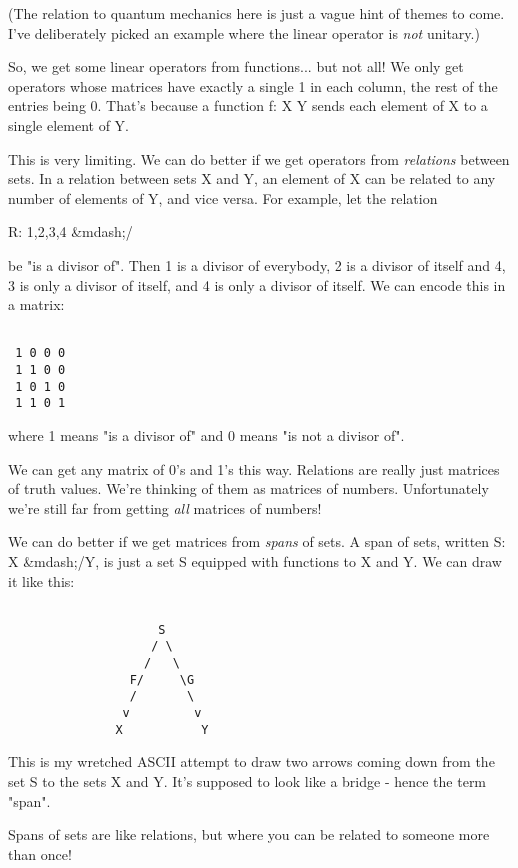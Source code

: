 (The relation to quantum mechanics here is just a vague hint of
themes to come.  I've deliberately picked an example where the linear
operator is \emph{not} unitary.)

So, we get some linear operators from functions... but not all!  
We only get operators whose matrices have exactly a single 1 in 
each column, the rest of the entries being 0.  That's because a
function f: X \to  Y sends each element of X to a single element of Y.

This is very limiting.  We can do better if we get operators from
\emph{relations} between sets.  In a relation between sets X and Y,
an element of X can be related to any number of elements of Y, and
vice versa.  For example, let the relation

R: {1,2,3,4} &mdash;/

be "is a divisor of".  Then 1 is a divisor of everybody, 2 is a 
divisor of itself and 4, 3 is only a divisor of itself, and 4 is
only a divisor of itself.  We can encode this in a matrix:


\begin{verbatim}

 1 0 0 0
 1 1 0 0
 1 0 1 0
 1 1 0 1
\end{verbatim}
    

where 1 means "is a divisor of" and 0 means "is not a
divisor of".

We can get any matrix of 0's and 1's this way.  Relations are really
just matrices of truth values.  We're thinking of them as matrices of 
numbers.  Unfortunately we're still far from getting \emph{all} matrices
of numbers!  

We can do better if we get matrices from \emph{spans} of sets.  A span of
sets, written S: X &mdash;/\to  Y, is just a set S equipped with functions to
X and Y.  We can draw it like this:


\begin{verbatim}

                     S
                    / \
                   /   \
                 F/     \G
                 /       \
                v         v 
               X           Y
\end{verbatim}
    
This is my wretched ASCII attempt to draw two arrows coming down from
the set S to the sets X and Y.  It's supposed to look like a bridge - 
hence the term "span".  

Spans of sets are like relations, but where you can be related to 
someone more than once!

